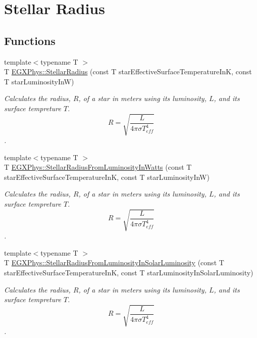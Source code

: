 \hypertarget{group___e_g_x_phys-_stellar_radius}{}\section{Stellar Radius}
\label{group___e_g_x_phys-_stellar_radius}
\subsection*{Functions}
\begin{DoxyCompactItemize}
\item 
{\footnotesize template$<$typename T $>$ }\\T \mbox{\hyperlink{group___e_g_x_phys-_stellar_radius_ga612cd22c37341a1864cd2fc5c858e18e}{E\+G\+X\+Phys\+::\+Stellar\+Radius}} (const T star\+Effective\+Surface\+Temperature\+InK, const T star\+Luminosity\+InW)
\begin{DoxyCompactList}\small\item\em Calculates the radius, $R$, of a star in meters using its luminosity, $L$, and its surface tempreture $T$. \[R=\sqrt{\dfrac{L}{4\pi \sigma T_{eff}^4}}\]. \end{DoxyCompactList}\item 
{\footnotesize template$<$typename T $>$ }\\T \mbox{\hyperlink{group___e_g_x_phys-_stellar_radius_ga59f0d5d89a857d30bff4c93713ee5bd9}{E\+G\+X\+Phys\+::\+Stellar\+Radius\+From\+Luminosity\+In\+Watts}} (const T star\+Effective\+Surface\+Temperature\+InK, const T star\+Luminosity\+InW)
\begin{DoxyCompactList}\small\item\em Calculates the radius, $R$, of a star in meters using its luminosity, $L$, and its surface tempreture $T$. \[R=\sqrt{\dfrac{L}{4\pi \sigma T_{eff}^4}}\]. \end{DoxyCompactList}\item 
{\footnotesize template$<$typename T $>$ }\\T \mbox{\hyperlink{group___e_g_x_phys-_stellar_radius_ga49f0848777ba12cdfc78d112d82036ce}{E\+G\+X\+Phys\+::\+Stellar\+Radius\+From\+Luminosity\+In\+Solar\+Luminosity}} (const T star\+Effective\+Surface\+Temperature\+InK, const T star\+Luminosity\+In\+Solar\+Luminosity)
\begin{DoxyCompactList}\small\item\em Calculates the radius, $R$, of a star in meters using its luminosity, $L$, and its surface tempreture $T$. \[R=\sqrt{\dfrac{L}{4\pi \sigma T_{eff}^4}}\]. \end{DoxyCompactList}\end{DoxyCompactItemize}


